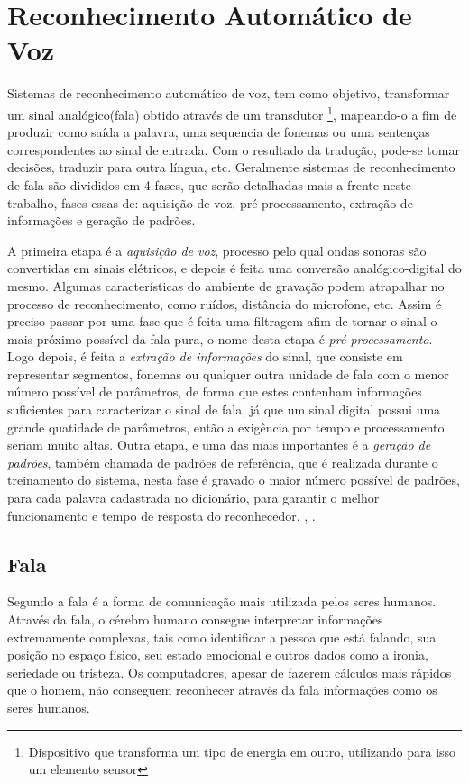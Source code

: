 \chapter{Reconhecimento Automático de Voz}

Sistemas de reconhecimento automático de voz, tem como objetivo, transformar um sinal analógico(fala) obtido através de um transdutor \footnote{ Dispositivo que transforma um tipo de energia em outro, utilizando para isso um elemento sensor}, mapeando-o a fim de produzir como saída a palavra, uma sequencia de fonemas ou uma sentenças correspondentes ao sinal de entrada. Com o resultado da tradução, pode-se tomar decisões, traduzir para outra língua, etc. Geralmente sistemas de reconhecimento de fala são divididos em 4 fases, que serão detalhadas mais a frente neste trabalho, fases essas de: aquisição de voz, pré-processamento, extração de informações e geração de padrões.  

A primeira etapa é a \textit{aquisição de voz}, processo pelo qual ondas sonoras são convertidas em sinais elétricos, e depois é feita uma conversão analógico-digital do mesmo. Algumas características do ambiente de gravação podem atrapalhar no processo de reconhecimento, como ruídos, distância do microfone, etc. Assim é preciso passar por uma fase que é feita uma filtragem afim de tornar o sinal o mais próximo possível da fala pura, o nome desta etapa é \textit{pré-processamento}. Logo depois, é feita a \textit{extração de informações} do sinal, que consiste em representar segmentos, fonemas ou qualquer outra unidade de fala com o menor número possível de parâmetros, de forma que estes contenham informações suficientes para caracterizar o sinal de fala, já que um sinal digital possui uma grande quatidade de parâmetros, então a exigência por tempo e processamento seriam muito altas. Outra etapa, e uma das mais importantes é a \textit{geração de padrões}, também chamada de padrões de referência, que é realizada durante o treinamento do sistema, nesta fase é gravado o maior número possível de padrões, para cada palavra cadastrada no dicionário, para garantir o melhor funcionamento e tempo de resposta do reconhecedor.
\cite{RavIsolAnderson}, \cite{RavComputLouzada}. 


\section{Fala}
Segundo  a fala é a forma de comunicação mais utilizada pelos seres humanos. Através da fala, o cérebro humano consegue interpretar informações extremamente complexas, tais como identificar a pessoa que está falando, sua posição no espaço físico, seu estado emocional e outros dados como a ironia, seriedade ou tristeza. Os computadores, apesar de fazerem cálculos mais rápidos que o homem, não conseguem reconhecer através da fala informações como os seres humanos.

